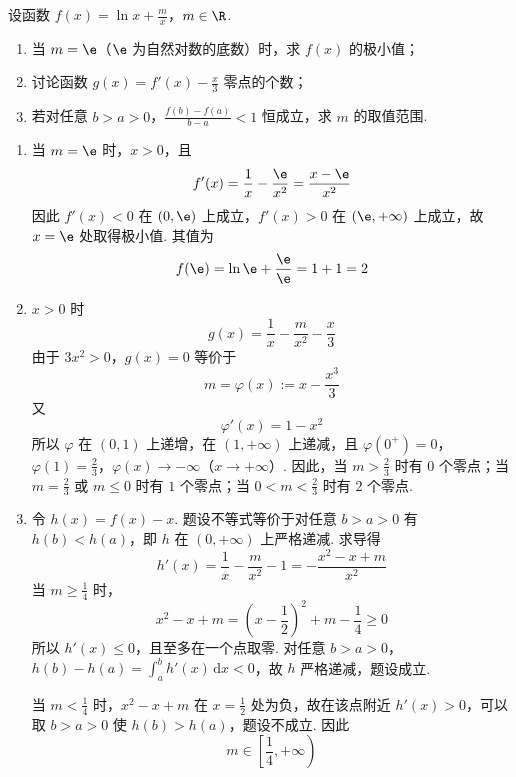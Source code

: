 \begin{problem}
设函数 \(f(x) = \ln x + \frac{m}{x}\)，\(m \in \R\).

\begin{enumerate}
\item 当 \(m = \e\)（\(\e\) 为自然对数的底数）时，求 \(f(x)\) 的极小值；
\item 讨论函数 \( g(x) = f'(x) - \frac{x}{3} \) 零点的个数；
\item 若对任意 \(b > a > 0\)，\(\frac{f(b) - f(a)}{b - a} < 1\) 恒成立，求 \(m\) 的取值范围.
\end{enumerate}
\begin{solution}
\begin{enumerate}
\item 当 \(m=\e\) 时，\(x>0\)，且
\[
f'(x)=\frac1x-\frac{\e}{x^2}=\frac{x-\e}{x^2}
\]
因此 \(f'(x)<0\) 在 \((0,\e)\) 上成立，\(f'(x)>0\) 在 \((\e,+\infty)\) 上成立，故 \(x=\e\) 处取得极小值. 其值为
\[
f(\e)=\ln\e+\frac{\e}{\e}=1+1=2
\]

\item \(x>0\) 时
\[
g(x)=\frac1x-\frac{m}{x^2}-\frac{x}{3}
\]
由于 \(3x^2>0\)，\(g(x)=0\) 等价于
\[
m=\varphi(x):=x-\frac{x^3}{3}
\]
又
\[
\varphi'(x)=1-x^2
\]
所以 \(\varphi\) 在 \((0,1)\) 上递增，在 \((1,+\infty)\) 上递减，且 \(\varphi(0^+)=0\)，\(\varphi(1)=\frac23\)，\(\varphi(x)\to-\infty\)（\(x\to+\infty\)）. 因此，当 \(m>\frac23\) 时有 \(0\) 个零点；当 \(m=\frac23\) 或 \(m\leqslant0\) 时有 \(1\) 个零点；当 \(0<m<\frac23\) 时有 \(2\) 个零点.
\item 令 \(h(x)=f(x)-x\). 题设不等式等价于对任意 \(b>a>0\) 有 \(h(b)<h(a)\)，即 \(h\) 在 \((0,+\infty)\) 上严格递减. 求导得
\[
h'(x)=\frac1x-\frac{m}{x^2}-1=-\frac{x^2-x+m}{x^2}
\]
当 \(m\geqslant\frac14\) 时，
\[
x^2-x+m=\left(x-\frac12\right)^2+m-\frac14\geqslant0
\]
所以 \(h'(x)\leqslant0\)，且至多在一个点取零. 对任意 \(b>a>0\)，\(h(b)-h(a)=\int_a^b h'(x)\,\mathrm dx<0\)，故 \(h\) 严格递减，题设成立.

当 \(m<\frac14\) 时，\(x^2-x+m\) 在 \(x=\frac12\) 处为负，故在该点附近 \(h'(x)>0\)，可以取 \(b>a>0\) 使 \(h(b)>h(a)\)，题设不成立. 因此
\[
m\in\left[\frac14,+\infty\right)
\]
\end{enumerate}
\end{solution}
\end{problem}
